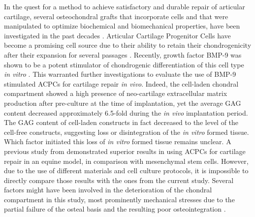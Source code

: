 \documentclass[twocolumn, empirical, authordate, issue]{jote-new-article}
\begin{document}
In the quest for a method to achieve satisfactory and durable repair of articular cartilage, several osteochondral grafts that incorporate cells and that were manipulated to optimize biochemical and biomechanical properties, have been investigated in the past decades \parencite{Huang2016}. Articular Cartilage Progenitor Cells have become a promising cell source due to their ability to retain their chondrogenicity after their expansion for several passages \parencite{Williams2010}. Recently, growth factor BMP-9 was shown to be a potent stimulator of chondrogenic differentiation of this cell type \emph{in vitro} \parencite{Morgan2020}. This warranted further investigations to evaluate the use of BMP-9 stimulated ACPCs for cartilage repair \emph{in vivo}. Indeed, the cell-laden chondral compartment showed a high presence of neo-cartilage extracellular matrix production after pre-culture at the time of implantation, yet the average GAG content decreased approximately 6.5-fold during the \emph{in vivo} implantation period. The GAG content of cell-laden constructs in fact decreased to the level of the cell-free constructs, suggesting loss or disintegration of the \emph{in vitro}
formed tissue. Which factor initiated this loss of \emph{in vitro}
formed tissue remains unclear. A previous study from \textcite{McCarthy2012} demonstrated superior results in using ACPCs for cartilage repair in an equine model, in comparison with mesenchymal stem cells. However, due to the use of different materials and cell culture protocols, it is impossible to directly compare those results with the ones from the current study. Several factors might have been involved in the deterioration of the chondral compartment in this study, most prominently mechanical stresses due to the partial failure of the osteal basis and the resulting poor osteointegration \parencite{Heuijerjans2018}.
\end{document}
